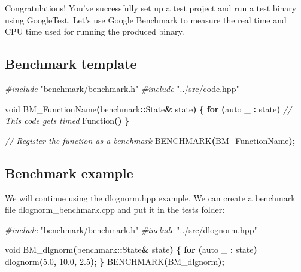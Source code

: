 \documentclass[
]{book}
\newenvironment{Shaded}{\begin{snugshade}}{\end{snugshade}}
\newcommand{\CommentTok}[1]{\textcolor[rgb]{0.56,0.35,0.01}{\textit{#1}}}
\newcommand{\ControlFlowTok}[1]{\textcolor[rgb]{0.13,0.29,0.53}{\textbf{#1}}}
\newcommand{\DataTypeTok}[1]{\textcolor[rgb]{0.13,0.29,0.53}{#1}}
\newcommand{\FloatTok}[1]{\textcolor[rgb]{0.00,0.00,0.81}{#1}}
\newcommand{\ImportTok}[1]{#1}
\newcommand{\NormalTok}[1]{#1}
\newcommand{\OperatorTok}[1]{\textcolor[rgb]{0.81,0.36,0.00}{\textbf{#1}}}
\newcommand{\PreprocessorTok}[1]{\textcolor[rgb]{0.56,0.35,0.01}{\textit{#1}}}
\begin{document}
Congratulations! You've successfully set up a test project and run a test binary using GoogleTest. Let's use Google Benchmark to measure the real time and CPU time used for running the produced binary.

\hypertarget{benchmark-template}{%
\subsection{Benchmark template}\label{benchmark-template}}

\begin{Shaded}
\begin{Highlighting}[]
\PreprocessorTok{\#include }\ImportTok{"benchmark/benchmark.h"}
\PreprocessorTok{\#include }\ImportTok{"../src/code.hpp"}

\DataTypeTok{void}\NormalTok{ BM\_FunctionName}\OperatorTok{(}\NormalTok{benchmark}\OperatorTok{::}\NormalTok{State}\OperatorTok{\&}\NormalTok{ state}\OperatorTok{)}
\OperatorTok{\{}
  \ControlFlowTok{for} \OperatorTok{(}\DataTypeTok{auto}\NormalTok{ \_ }\OperatorTok{:}\NormalTok{ state}\OperatorTok{)}
    \CommentTok{// This code gets timed}
\NormalTok{    Function}\OperatorTok{()}
\OperatorTok{\}}

\CommentTok{// Register the function as a benchmark}
\NormalTok{BENCHMARK}\OperatorTok{(}\NormalTok{BM\_FunctionName}\OperatorTok{);}
\end{Highlighting}
\end{Shaded}

\hypertarget{benchmark-example}{%
\subsection{Benchmark example}\label{benchmark-example}}

We will continue using the dlognorm.hpp example. We can create a benchmark file dlognorm\_benchmark.cpp and put it in the tests folder:

\begin{Shaded}
\begin{Highlighting}[]
\PreprocessorTok{\#include }\ImportTok{"benchmark/benchmark.h"}
\PreprocessorTok{\#include }\ImportTok{"../src/dlognorm.hpp"}

\DataTypeTok{void}\NormalTok{ BM\_dlgnorm}\OperatorTok{(}\NormalTok{benchmark}\OperatorTok{::}\NormalTok{State}\OperatorTok{\&}\NormalTok{ state}\OperatorTok{)}
\OperatorTok{\{}
  \ControlFlowTok{for} \OperatorTok{(}\DataTypeTok{auto}\NormalTok{ \_ }\OperatorTok{:}\NormalTok{ state}\OperatorTok{)}
\NormalTok{    dlognorm}\OperatorTok{(}\FloatTok{5.0}\OperatorTok{,} \FloatTok{10.0}\OperatorTok{,} \FloatTok{2.5}\OperatorTok{);}
\OperatorTok{\}}
\NormalTok{BENCHMARK}\OperatorTok{(}\NormalTok{BM\_dlgnorm}\OperatorTok{);}
\end{Highlighting}
\end{Shaded}
\end{document}
